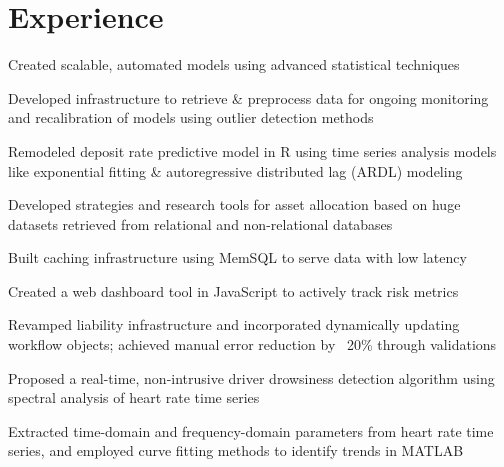 \documentclass[]{deedy-resume-openfont}
\begin{document}
\begin{minipage}[t]{0.66\textwidth} 


\section{Experience}

\vspace{\topsep} %
\begin{tightemize}
\item Created scalable, automated models using advanced statistical techniques
\item Developed infrastructure to retrieve \& preprocess data for ongoing monitoring and recalibration of models using outlier detection methods
\item Remodeled deposit rate predictive model in R using time series analysis models like exponential fitting \& autoregressive distributed lag (ARDL) modeling
\end{tightemize}
\sectionsep

\begin{tightemize}
\item Developed strategies and research tools for asset allocation based on huge datasets retrieved from relational and non-relational databases 
\item Built caching infrastructure using MemSQL to serve data with low latency
\item Created a web dashboard tool in JavaScript to actively track risk metrics
\item Revamped liability infrastructure and incorporated dynamically updating workflow objects; achieved manual error reduction by ~20\% through validations
\end{tightemize}
\sectionsep

\begin{tightemize}
\item Proposed a real-time, non-intrusive driver drowsiness detection algorithm using spectral analysis of heart rate time series
\item Extracted time-domain and frequency-domain parameters from heart rate time series, and employed curve fitting methods to identify trends in MATLAB


\end{tightemize}
\end{minipage}
\end{document}
